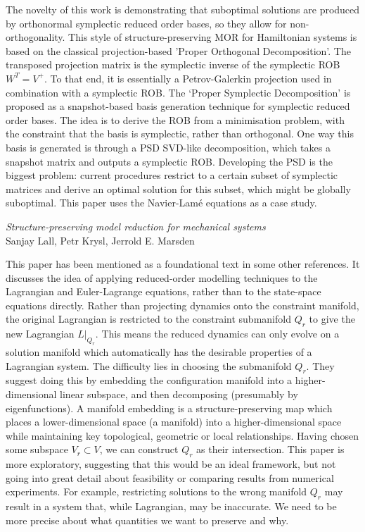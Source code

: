 \documentclass{article}
\begin{document}
The novelty of this work is demonstrating that suboptimal solutions are produced by orthonormal symplectic reduced order bases, so they allow for non-orthogonality. This style of structure-preserving MOR for Hamiltonian systems is based on the classical projection-based 'Proper Orthogonal Decomposition'. The transposed projection matrix is the symplectic inverse of the symplectic ROB $W^T = V^+$. To that end, it is essentially a Petrov-Galerkin projection used in combination with a symplectic ROB. The `Proper Symplectic Decomposition' is proposed as a snapshot-based basis generation technique for symplectic reduced order bases. The idea is to derive the ROB from a minimisation problem, with the constraint that the basis is symplectic, rather than orthogonal. One way this basis is generated is through a PSD SVD-like decomposition, which takes a snapshot matrix and outputs a symplectic ROB. Developing the PSD is the biggest problem: current procedures restrict to a certain subset of symplectic matrices and derive an optimal solution for this subset, which might be globally suboptimal. \newline
This paper uses the Navier-Lam\'{e} equations as a case study.


\vspace{2cm}

\begin{center}
    \textit{Structure-preserving model reduction for mechanical systems} \\
    Sanjay Lall, Petr Krysl, Jerrold E. Marsden \cite{lall2003}
\end{center}

This paper has been mentioned as a foundational text in some other references. It discusses the idea of applying reduced-order modelling techniques to the Lagrangian and Euler-Lagrange equations, rather than to the state-space equations directly. Rather than projecting dynamics onto the constraint manifold, the original Lagrangian is restricted to the constraint submanifold $Q_r$ to give the new Lagrangian $L|_{Q_r}$. This means the reduced dynamics can only evolve on a solution manifold which automatically has the desirable properties of a Lagrangian system. The difficulty lies in choosing the submanifold $Q_r$. They suggest doing this by embedding the configuration manifold into a higher-dimensional linear subspace, and then decomposing (presumably by eigenfunctions). A manifold embedding is a structure-preserving map which places a lower-dimensional space (a manifold) into a higher-dimensional space while maintaining key topological, geometric or local relationships. Having chosen some subspace $V_r \subset V$, we can construct $Q_r$ as their intersection. This paper is more exploratory, suggesting that this would be an ideal framework, but not going into great detail about feasibility or comparing results from numerical experiments. For example, restricting solutions to the wrong manifold $Q_r$ may result in a system that, while Lagrangian, may be inaccurate. We need to be more precise about what quantities we want to preserve and why.
\end{document}
